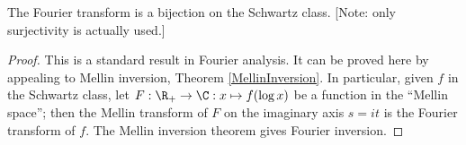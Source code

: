 \begin{lemma}
\label{bij}
\leanok
The Fourier transform is a bijection on the Schwartz class. [Note: only surjectivity is
  actually used.]
\end{lemma}
\begin{proof}
\leanok
This is a standard result in Fourier analysis.
  It can be proved here by appealing to Mellin inversion, Theorem \ref{MellinInversion}.
  In particular, given $f$ in the Schwartz class, let
  $F : \R_+ \to \C : x \mapsto f(\log x)$ be a function in the ``Mellin space''; then the
  Mellin transform of $F$ on the imaginary axis $s=it$ is the Fourier transform of $f$.
  The Mellin inversion theorem gives Fourier inversion.
\end{proof}
